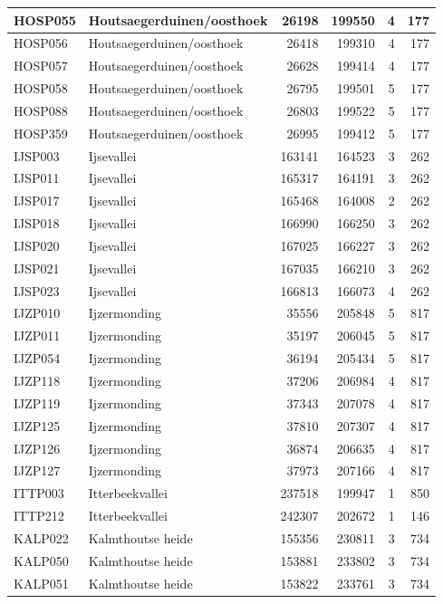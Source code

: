 \documentclass[11pt,]{book}
\begin{document}
\begin{table}
\begin{tabular}[t]{l|l|r|r|r|r}
\hline
HOSP055 & Houtsaegerduinen/oosthoek & 26198 & 199550 & 4 & 177\\
\hline
HOSP056 & Houtsaegerduinen/oosthoek & 26418 & 199310 & 4 & 177\\
\hline
HOSP057 & Houtsaegerduinen/oosthoek & 26628 & 199414 & 4 & 177\\
\hline
HOSP058 & Houtsaegerduinen/oosthoek & 26795 & 199501 & 5 & 177\\
\hline
HOSP088 & Houtsaegerduinen/oosthoek & 26803 & 199522 & 5 & 177\\
\hline
HOSP359 & Houtsaegerduinen/oosthoek & 26995 & 199412 & 5 & 177\\
\hline
IJSP003 & Ijsevallei & 163141 & 164523 & 3 & 262\\
\hline
IJSP011 & Ijsevallei & 165317 & 164191 & 3 & 262\\
\hline
IJSP017 & Ijsevallei & 165468 & 164008 & 2 & 262\\
\hline
IJSP018 & Ijsevallei & 166990 & 166250 & 3 & 262\\
\hline
IJSP020 & Ijsevallei & 167025 & 166227 & 3 & 262\\
\hline
IJSP021 & Ijsevallei & 167035 & 166210 & 3 & 262\\
\hline
IJSP023 & Ijsevallei & 166813 & 166073 & 4 & 262\\
\hline
IJZP010 & Ijzermonding & 35556 & 205848 & 5 & 817\\
\hline
IJZP011 & Ijzermonding & 35197 & 206045 & 5 & 817\\
\hline
IJZP054 & Ijzermonding & 36194 & 205434 & 5 & 817\\
\hline
IJZP118 & Ijzermonding & 37206 & 206984 & 4 & 817\\
\hline
IJZP119 & Ijzermonding & 37343 & 207078 & 4 & 817\\
\hline
IJZP125 & Ijzermonding & 37810 & 207307 & 4 & 817\\
\hline
IJZP126 & Ijzermonding & 36874 & 206635 & 4 & 817\\
\hline
IJZP127 & Ijzermonding & 37973 & 207166 & 4 & 817\\
\hline
ITTP003 & Itterbeekvallei & 237518 & 199947 & 1 & 850\\
\hline
ITTP212 & Itterbeekvallei & 242307 & 202672 & 1 & 146\\
\hline
KALP022 & Kalmthoutse heide & 155356 & 230811 & 3 & 734\\
\hline
KALP050 & Kalmthoutse heide & 153881 & 233802 & 3 & 734\\
\hline
KALP051 & Kalmthoutse heide & 153822 & 233761 & 3 & 734\\

\end{tabular}
\end{table}
\end{document}
